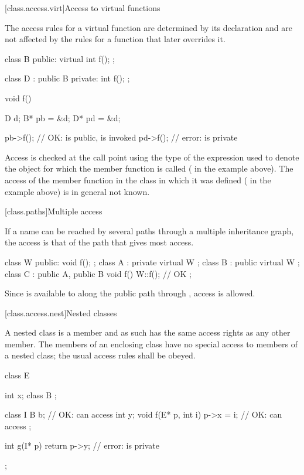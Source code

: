 [class.access.virt]{Access to virtual functions}%

\pnum
The access rules for a virtual function are determined by its declaration
and are not affected by the rules for a function that later overrides it.
\begin{example}

\begin{codeblock}
class B {
public:
  virtual int f();
};

class D : public B {
private:
  int f();
};

void f() {
  D d;
  B* pb = &d;
  D* pd = &d;

  pb->f();                      // OK:  is public,  is invoked
  pd->f();                      // error:  is private
}
\end{codeblock}
\end{example}

\pnum
Access is checked at the call point using the type of the expression used
to denote the object for which the member function is called
(
in the example above).
The access of the member function in the class in which it was defined
(
in the example above) is in general not known.

[class.paths]{Multiple access}%

\pnum
If a name can be reached by several paths through a multiple inheritance
graph, the access is that of the path that gives most access.
\begin{example}

\begin{codeblock}
class W { public: void f(); };
class A : private virtual W { };
class B : public virtual W { };
class C : public A, public B {
  void f() { W::f(); }          // OK
};
\end{codeblock}

Since
is available to
along the public path through
,
access is allowed.
\end{example}

[class.access.nest]{Nested classes}%
%

\pnum
A nested class is a member and as such has the same access rights as any other member.
The members of an enclosing class have no special access to members of a nested
class; the usual access rules shall be obeyed.
\begin{example}
\begin{codeblock}
class E {
  int x;
  class B { };

  class I {
    B b;                        // OK:  can access 
    int y;
    void f(E* p, int i) {
      p->x = i;                 // OK:  can access 
    }
  };

  int g(I* p) {
    return p->y;                // error:  is private
  }
};
\end{codeblock}
\end{example}%

